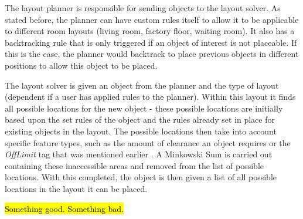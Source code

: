 The layout planner is responsible for sending objects to the layout solver. As stated before, the planner can have custom rules itself to allow it to be applicable to different room layouts (living room, factory floor, waiting room). It also has a backtracking rule that is only triggered if an object of interest is not placeable. If this is the case, the planner would backtrack to place previous objects in different positions to allow this object to be placed.

The layout solver is given an object from the planner and the type of layout (dependent if a user has applied rules to the planner). Within this layout it finds all possible locations for the new object - these possible locations are initially based upon the set rules of the object and the rules already set in place for existing objects in the layout. The possible locations then take into account specific feature types, such as the amount of clearance an object requires or the \textit{OffLimit} tag that was mentioned earlier \cite{rule-based-layout}. A Minkowski Sum \cite{minkowski} is carried out containing these inaccessible areas and removed from the list of possible locations.
With this completed, the object is then given a list of all possible locations in the layout it can be placed.

\hl{Something good. Something bad.}

